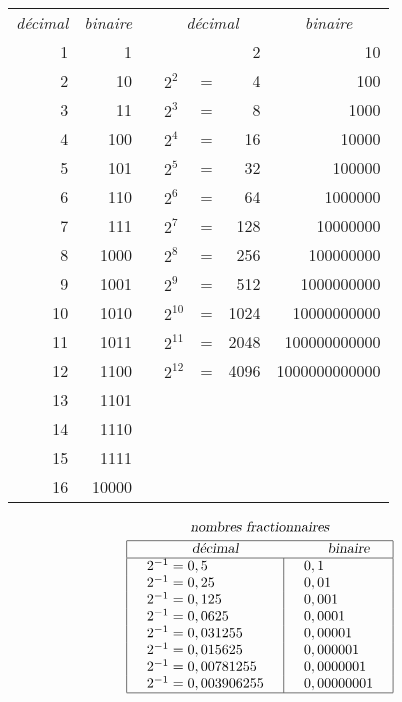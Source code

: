\begin{center}
\begin{tabular}{|r|r|c|lcr|r|}
\cline{1-2} \cline{4-7}
\multicolumn{1}{|c|}{\emph{ décimal}} & \multicolumn{1}{|c|}{\emph{ binaire}}  & &  \multicolumn{3}{|c|}{\emph{ décimal}} & \multicolumn{1}{|c|}{\emph{ binaire}}   \\
\cline{1-2} \cline{4-7}
1  & 1  &  &  &  & 2  & 10 \\
2  & 10  &  & $2^{2}$  & =  & 4  & 100 \\
3  & 11  &  & $2^{3}$  & =  & 8  & 1000 \\
4  & 100  &  & $2^{4}$  & =  & 16  & 10000 \\
5  & 101  &  & $2^{5}$  & =  & 32  & 100000 \\
6  & 110  &  & $2^{6}$  & =  & 64  & 1000000 \\
7  & 111  &  & $2^{7}$  & =  & 128  & 10000000 \\
8  & 1000  &  & $2^{8}$  & =  & 256  & 100000000 \\
9  & 1001  &  & $2^{9}$  & =  & 512  & 1000000000 \\
10  & 1010  &  & $2^{10}$  & =  & 1024  & 10000000000 \\
11  & 1011  &  & $2^{11}$  & =  & 2048  & 100000000000 \\
12  & 1100  &  & $2^{12}$  & =  & 4096  & 1000000000000 \\
13  & 1101  &  &  &  &  & \\
14  & 1110  &  &  &  &  & \\
15  & 1111  &  &  &  &  & \\
16  & 10000  &  &  &  &  & \\
\cline{1-2} \cline{4-7}
\end{tabular}
\end{center}

\[
     \begin{array}{|@{\hspace*{.5cm}}l@{\hspace*{.5cm}} | @{\hspace*{.5cm}}l@{\hspace*{.5cm}}|}
     \multicolumn{2}{c}{\textsl{nombres fractionnaires}} \\[1mm]
     \hline
     \multicolumn{1}{|c}{\textsl{décimal}} &   \multicolumn{1}{c|}{\textsl{binaire}} \\
     \hline 
      2^{-1} = 0,5                & 0,1 \\
      2^{-1} = 0,25               & 0,01 \\
      2^{-1} = 0,125              & 0,001 \\
      2^{-1} = 0,0625             & 0,0001 \\
      2^{-1} = 0,031255           & 0,00001 \\
      2^{-1} = 0,015625           & 0,000001 \\
      2^{-1} = 0,00781255         & 0,0000001 \\
      2^{-1} = 0,003906255       & 0,00000001\\
     \hline 
     \end{array} 
\] 

